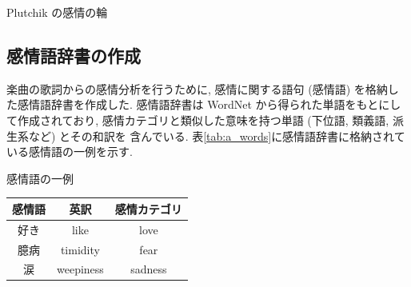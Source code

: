\documentclass{jpreprint}
\begin{document}
\begin{multicols}{2}
\begin{figurehere}
  \centering
  \vspace{-0.5cm}
  \caption{Plutchik の感情の輪}
  \label{fig:woe}
\end{figurehere}

\subsection{感情語辞書の作成}
楽曲の歌詞からの感情分析を行うために,
感情に関する語句 (感情語) を格納した感情語辞書を作成した.
感情語辞書は 
WordNet \cite{WN} から得られた単語をもとにして作成されており,
感情カテゴリと類似した意味を持つ単語
(下位語, 類義語, 派生系など) とその和訳を
含んでいる.
表\ref{tab:a_words}に感情語辞書に格納されている感情語の一例を示す.

\begin{tablehere}
  \caption{感情語の一例}
  \label{tab:a_words}
  \begin{tabular}{ccc}
    \hline
    \hline
    感情語 & 英訳 & 感情カテゴリ \\
    \hline
    好き & like & love \\
    臆病 & timidity & fear \\
    涙 & weepiness & sadness \\
    \hline
    \hline
  \end{tabular}
\end{tablehere}



\end{multicols}
\end{document}
